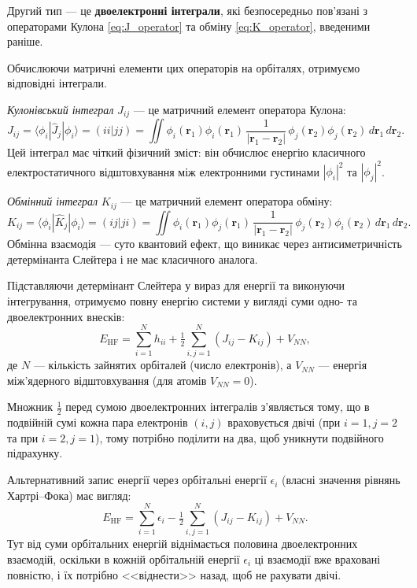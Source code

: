 Другий тип --- це \textbf{двоелектронні інтеграли}, які безпосередньо пов'язані з операторами Кулона \eqref{eq:J_operator} та обміну \eqref{eq:K_operator}, введеними раніше.

Обчислюючи матричні елементи цих операторів на орбіталях, отримуємо відповідні інтеграли.

\textit{Кулонівський інтеграл} $J_{ij}$ --- це матричний елемент оператора Кулона:
\[
	J_{ij} = \langle \phi_i | \hat{J}_j | \phi_i \rangle = (ii|jj) =
	\iint
	\phi_i(\mathbf r_1)\phi_i(\mathbf r_1)\,
	\frac{1}{|\mathbf r_1 - \mathbf r_2|}\,
	\phi_j(\mathbf r_2)\phi_j(\mathbf r_2)\,
	d\mathbf r_1\, d\mathbf r_2.
\]
Цей інтеграл має чіткий фізичний зміст: він обчислює енергію класичного електростатичного відштовхування між електронними густинами $|\phi_i|^2$ та $|\phi_j|^2$.

\textit{Обмінний інтеграл} $K_{ij}$ --- це матричний елемент оператора обміну:
\[
	K_{ij} = \langle \phi_i | \hat{K}_j | \phi_i \rangle = (ij|ji) =
	\iint
	\phi_i(\mathbf r_1)\phi_j(\mathbf r_1)\,
	\frac{1}{|\mathbf r_1 - \mathbf r_2|}\,
	\phi_j(\mathbf r_2)\phi_i(\mathbf r_2)\,
	d\mathbf r_1\, d\mathbf r_2.
\]
Обмінна взаємодія --- суто квантовий ефект, що виникає через антисиметричність детермінанта Слейтера і не має класичного аналога.

Підставляючи детермінант Слейтера у вираз для енергії та виконуючи інтегрування, отримуємо повну енергію системи у вигляді суми одно- та двоелектронних внесків:
\begin{equation*}
	E_{\mathrm{HF}} = \sum_{i=1}^{N} h_{ii}
	+ \tfrac{1}{2}\sum_{i,j=1}^{N} (J_{ij} - K_{ij}) + V_{NN},
\end{equation*}
де $N$ --- кількість зайнятих орбіталей (число електронів), а $V_{NN}$ --- енергія між'ядерного відштовхування (для атомів $V_{NN}=0$).

Множник $\tfrac{1}{2}$ перед сумою двоелектронних інтегралів з'являється тому, що в подвійній сумі кожна пара електронів $(i,j)$ враховується двічі (при $i=1, j=2$ та при $i=2, j=1$), тому потрібно поділити на два, щоб уникнути подвійного підрахунку.

Альтернативний запис енергії через орбітальні енергії $\epsilon_i$ (власні значення рівнянь Хартрі–Фока) має вигляд:
\begin{equation*}
	E_{\mathrm{HF}} = \sum_{i=1}^{N} \epsilon_i - \tfrac{1}{2}\sum_{i,j=1}^{N} (J_{ij} - K_{ij}) + V_{NN}.
\end{equation*}
Тут від суми орбітальних енергій віднімається половина двоелектронних взаємодій, оскільки в кожній орбітальній енергії $\epsilon_i$ ці взаємодії вже враховані повністю, і їх потрібно <<віднести>> назад, щоб не рахувати двічі.

